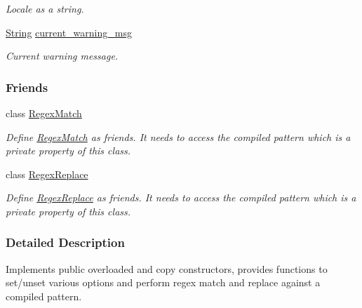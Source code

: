\begin{DoxyCompactItemize}
\begin{DoxyCompactList}\small\item\em Locale as a string. \end{DoxyCompactList}\item 
\hyperlink{namespacejpcre2_a91f03070152fb228bc116c5a737f1d16}{String} \hyperlink{classjpcre2_1_1Regex_a1cfacd49c8bceaae1e2a66efd4082ea8}{current\+\_\+warning\+\_\+msg}\hypertarget{classjpcre2_1_1Regex_a1cfacd49c8bceaae1e2a66efd4082ea8}{}\label{classjpcre2_1_1Regex_a1cfacd49c8bceaae1e2a66efd4082ea8}

\begin{DoxyCompactList}\small\item\em Current warning message. \end{DoxyCompactList}\end{DoxyCompactItemize}
\subsubsection*{Friends}
\begin{DoxyCompactItemize}
\item 
class \hyperlink{classjpcre2_1_1Regex_aaa8d9b93cf5a8b9ebbb78923a1494445}{Regex\+Match}\hypertarget{classjpcre2_1_1Regex_aaa8d9b93cf5a8b9ebbb78923a1494445}{}\label{classjpcre2_1_1Regex_aaa8d9b93cf5a8b9ebbb78923a1494445}

\begin{DoxyCompactList}\small\item\em Define \hyperlink{classjpcre2_1_1RegexMatch}{Regex\+Match} as friends. It needs to access the compiled pattern which is a private property of this class. \end{DoxyCompactList}\item 
class \hyperlink{classjpcre2_1_1Regex_a2547cb5380cbe0374ac0d44d34018dbb}{Regex\+Replace}\hypertarget{classjpcre2_1_1Regex_a2547cb5380cbe0374ac0d44d34018dbb}{}\label{classjpcre2_1_1Regex_a2547cb5380cbe0374ac0d44d34018dbb}

\begin{DoxyCompactList}\small\item\em Define \hyperlink{classjpcre2_1_1RegexReplace}{Regex\+Replace} as friends. It needs to access the compiled pattern which is a private property of this class. \end{DoxyCompactList}\end{DoxyCompactItemize}


\subsubsection{Detailed Description}
Implements public overloaded and copy constructors, provides functions to set/unset various options and perform regex match and replace against a compiled pattern. 

